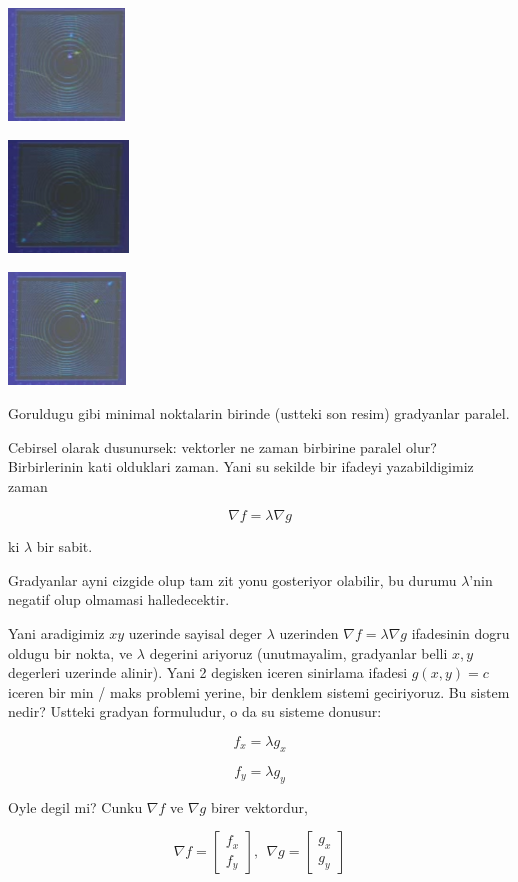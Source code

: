 \documentclass[12pt,fleqn]{article}\usepackage{../common}
\begin{document}
\includegraphics[height=3cm]{13_4.png}

\includegraphics[height=3cm]{13_6.png}

\includegraphics[height=3cm]{13_5.png}

Goruldugu gibi minimal noktalarin birinde (ustteki son resim) gradyanlar
paralel. 

Cebirsel olarak dusunursek: vektorler ne zaman birbirine paralel olur?
Birbirlerinin kati olduklari zaman. Yani su sekilde bir ifadeyi
yazabildigimiz zaman

\[ \nabla f = \lambda \nabla g \]

ki $\lambda$ bir sabit. 

Gradyanlar ayni cizgide olup tam zit yonu gosteriyor olabilir, bu durumu
$\lambda$'nin negatif olup olmamasi halledecektir.

Yani aradigimiz $xy$ uzerinde sayisal deger $\lambda$ uzerinden $\nabla f =
\lambda \nabla g $ ifadesinin 
dogru oldugu bir nokta, ve $\lambda$ degerini ariyoruz (unutmayalim,
gradyanlar belli $x,y$ degerleri uzerinde alinir). Yani 2 degisken iceren
sinirlama  ifadesi $g(x,y)=c$ iceren bir min
/ maks problemi yerine, bir denklem sistemi geciriyoruz. Bu sistem nedir?
Ustteki gradyan formuludur, o da su sisteme donusur:

\[ f_x = \lambda g_x \]

\[ f_y = \lambda g_y \]

Oyle degil mi? Cunku $\nabla f$ ve $\nabla g$ birer vektordur, 

\[ 
\nabla f =
\left[\begin{array}{r}
f_x \\
f_y
\end{array}\right], \ \ 
\nabla g =
\left[\begin{array}{r}
g_x \\
g_y
\end{array}\right]
 \]
\end{document}
